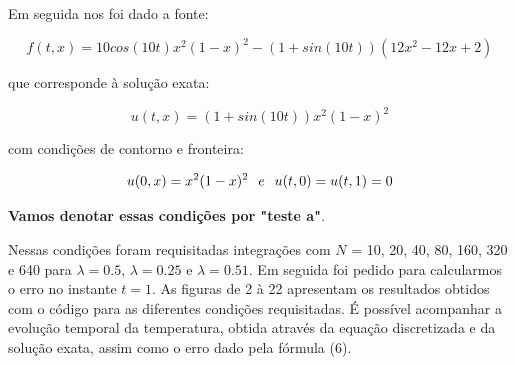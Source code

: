\documentclass[a4paper, 12pt]{article}
\begin{document}
Em seguida nos foi dado a fonte:

$$f(t, x) = 10cos(10t)x^{2}(1-x)^{2}-(1+sin(10t))(12x^{2}-12x+2)$$

que corresponde à solução exata:

$$u(t, x) = (1+sin(10t))x^{2}(1-x)^{2}$$

com condições de contorno e fronteira:

$$u(0,x) = x^{2}(1-x)^{2} \hspace{0.25cm} e \hspace{0.25cm} u(t,0) = u(t,1) = 0$$

\textbf{Vamos denotar essas condições por "teste a"}.

Nessas condições foram requisitadas integrações com $N$ = 10, 20, 40, 80, 160, 320 e 640 para $\lambda = 0.5$, $\lambda = 0.25$ e $\lambda= 0.51$. Em seguida foi pedido para calcularmos o erro no instante $t=1$. As figuras de 2 à 22 apresentam os resultados obtidos com o código para as diferentes condições requisitadas. É possível acompanhar a evolução temporal da temperatura, obtida através da equação discretizada e da solução exata, assim como o erro dado pela fórmula (6).
\end{document}
